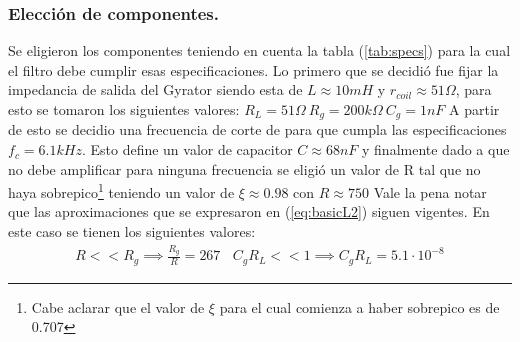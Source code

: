 \documentclass[a4paper]{article}
\begin{document}
\subsubsection{Elección de componentes.}
Se eligieron los componentes teniendo en cuenta la tabla (\ref{tab:specs}) para la cual el filtro debe cumplir esas especificaciones.
Lo primero que se decidió fue fijar la impedancia de salida del Gyrator siendo esta de $L \approx 10mH $ y $r_{coil} \approx 51\Omega $, para esto se tomaron los siguientes valores: $R_L = 51\Omega \ R_g = 200k\Omega \ C_g = 1nF$
A partir de esto se decidio una frecuencia de corte de  para que cumpla las especificaciones $f_c =6.1kHz $. Esto define un valor de capacitor $C \approx 68nF$ y finalmente dado a que no debe amplificar para ninguna frecuencia se eligió un valor de R tal que no haya sobrepico\footnote{Cabe aclarar que el valor de $\xi$ para el cual comienza a haber sobrepico es de 0.707} teniendo un valor de $\xi \approx 0.98 $ con $R \approx 750 $
Vale la pena notar que las aproximaciones que se expresaron en (\ref{eq:basicL2}) siguen vigentes. En este caso se tienen los siguientes valores:
\begin{align}  R<<R_g \implies  \frac{R_g}{R}=  267 \ \ \ \ C_gR_L << 1 \implies C_gR_L=5.1 \cdot 10^{-8} \end{align}

\end{document}
